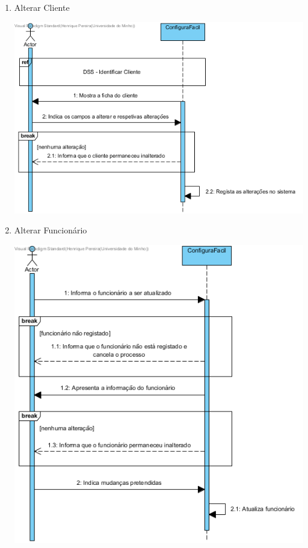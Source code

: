 \documentclass[11pt]{article} %
\begin{document}
\begin{enumerate}
\begin{center}
		\end{center}\newpage
	\item Alterar Cliente
		\begin{center}
 			\includegraphics[width = 6in]{dss_alterar_cliente.png}
		\end{center}
	\item Alterar Funcionário
		\begin{center}
 			\includegraphics[width = 6in]{dss_alterar_funcionario.png}
		\end{center}\newpage

\end{enumerate}
\end{document}
